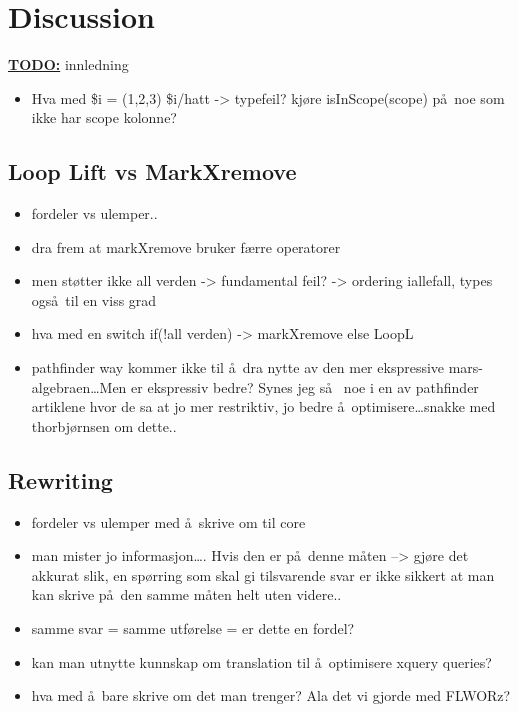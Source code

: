 \chapter{Discussion}
\label{chapter:discussion}

\textbf{\underline{\LARGE TODO:}} innledning

\begin{itemize}
	\item Hva med \$i = (1,2,3) \$i/hatt -> typefeil? kj\o re isInScope(scope) p\aa~noe som ikke har scope kolonne?
\end{itemize}

\section{Loop Lift vs MarkXremove}
\label{sect:discussion:llvsmXr}
\begin{itemize}
  \item fordeler vs ulemper..
  \item dra frem at markXremove bruker f\ae rre operatorer
  \item men st\o tter ikke all verden -> fundamental feil? -> ordering iallefall, types ogs\aa~til en viss grad
  \item hva med en switch if(!all verden) -> markXremove else LoopL
  \item pathfinder way kommer ikke til \aa~dra nytte av den mer ekspressive mars-algebraen\ldots Men er ekspressiv
	  bedre? Synes jeg s\aa~ noe i en av pathfinder artiklene hvor de sa at jo mer restriktiv, jo bedre
	  \aa~optimisere\ldots snakke med thorbj\o rnsen om dette..
\end{itemize}

\section{Rewriting}
\label{sect:discussion:rewriting}
\begin{itemize}
  \item fordeler vs ulemper med \aa~skrive om til core
  \item man mister jo informasjon\ldots. Hvis den er p\aa~denne m\aa ten --> gj\o re det akkurat
	  slik, en sp\o rring som skal gi tilsvarende svar er ikke sikkert at man kan
	  skrive p\aa~den samme m\aa ten helt uten videre..  
  \item samme svar = samme utf\o relse = er dette en fordel?
  \item kan man utnytte kunnskap om translation til \aa~optimisere xquery queries?
  \item hva med \aa~bare skrive om det man trenger? Ala det vi gjorde med FLWORz?
\end{itemize}

